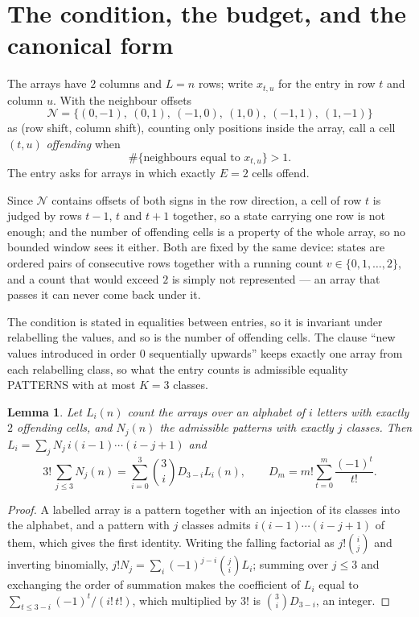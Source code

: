 \documentclass[11pt,a4paper]{article}
\theoremstyle{plain}
\newtheorem{lemma}[theorem]{Lemma}
\theoremstyle{definition}
\begin{document}
\section{The condition, the budget, and the canonical form}

The arrays have $2$ columns and $L=n$ rows; write $x_{t,u}$ for the entry in
row $t$ and column $u$. With the neighbour offsets
\[
\mathcal N=\{(0,-1),\ (0,1),\ (-1,0),\ (1,0),\ (-1,1),\ (1,-1)\}
\]
as (row shift, column shift), counting only positions inside the array, call a cell
$(t,u)$ \emph{offending} when
\[
\#\{\text{neighbours equal to }x_{t,u}\}>1 .
\]
The entry asks for arrays in which exactly $E=2$ cells offend.

Since $\mathcal N$ contains offsets of both signs in the row direction, a cell of row
$t$ is judged by rows $t-1$, $t$ and $t+1$ together, so a state carrying one row is not
enough; and the number of offending cells is a property of the whole array, so no bounded
window sees it either. Both are fixed by the same device: states are ordered pairs of
consecutive rows together with a running count $v\in\{0,1,\dots,2\}$, and a count that
would exceed $2$ is simply not represented --- an array that passes it can never come back
under it.

The condition is stated in equalities between entries, so it is invariant under relabelling
the values, and so is the number of offending cells. The clause ``new values introduced in
order $0$ sequentially upwards'' keeps exactly one array from each relabelling class, so what
the entry counts is admissible equality PATTERNS with at most $K=3$ classes.

\begin{lemma}\label{lem:inv}
Let $L_i(n)$ count the arrays over an alphabet of $i$ letters with exactly $2$ offending
cells, and $N_j(n)$ the admissible patterns with exactly $j$ classes. Then
$L_i=\sum_j N_j\,i(i-1)\cdots(i-j+1)$ and
\[
3!\,\sum_{j\le3}N_j(n)=\sum_{i=0}^{3}\binom{3}{i}D_{3-i}L_i(n),
\qquad D_m=m!\sum_{t=0}^{m}\frac{(-1)^t}{t!} .
\]
\end{lemma}

\begin{proof}
A labelled array is a pattern together with an injection of its classes into the alphabet,
and a pattern with $j$ classes admits $i(i-1)\cdots(i-j+1)$ of them, which gives the first
identity. Writing the falling factorial as $j!\binom{i}{j}$ and inverting binomially,
$j!N_j=\sum_i(-1)^{j-i}\binom{j}{i}L_i$; summing over $j\le3$ and exchanging the
order of summation makes the coefficient of $L_i$ equal to
$\sum_{t\le3-i}(-1)^t/(i!\,t!)$, which multiplied by $3!$ is
$\binom{3}{i}D_{3-i}$, an integer.
\end{proof}
\end{document}
